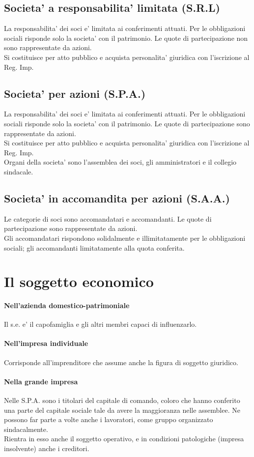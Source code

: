 \documentclass{report}
\begin{document}
	\subsection{Societa' a responsabilita' limitata (S.R.L)}
	La responsabilita' dei soci e' limitata ai conferimenti attuati. Per le obbligazioni sociali risponde solo la societa' con il patrimonio. Le quote di partecipazione non sono rappresentate da azioni.\medskip \\Si costituisce per atto pubblico e acquista personalita' giuridica con l'iscrizione al Reg. Imp.
	\subsection{Societa' per azioni (S.P.A.)}
	La responsabilita' dei soci e' limitata ai conferimenti attuati. Per le obbligazioni sociali risponde solo la societa' con il patrimonio. Le quote di partecipazione sono rappresentate da azioni.
	\medskip \\Si costituisce per atto pubblico e acquista personalita' giuridica con l'iscrizione al Reg. Imp.\medskip \\Organi della societa' sono l'assemblea dei soci, gli amministratori e il collegio sindacale.
	\subsection{Societa' in accomandita per azioni (S.A.A.)}
	Le categorie di soci sono accomandatari e accomandanti. Le quote di partecipazione sono rappresentate da azioni.\medskip \\Gli accomandatari rispondono solidalmente e illimitatamente per le obbligazioni sociali; gli accomandanti limitatamente alla quota conferita.
	\section{Il soggetto economico}
	\paragraph{Nell'azienda domestico-patrimoniale} Il s.e. e' il capofamiglia e gli altri membri capaci di influenzarlo.
	\paragraph{Nell'impresa individuale}Corrisponde all'imprenditore che assume anche la figura di soggetto giuridico.
	\paragraph{Nella grande impresa}
	Nelle S.P.A. sono i titolari del capitale di comando, coloro che hanno conferito una parte del capitale sociale tale da avere la maggioranza nelle assemblee. Ne possono far parte a volte anche i lavoratori, come gruppo organizzato sindacalmente.
	\medskip \\Rientra in esso anche il soggetto operativo, e in condizioni patologiche (impresa insolvente) anche i creditori.
\end{document}
